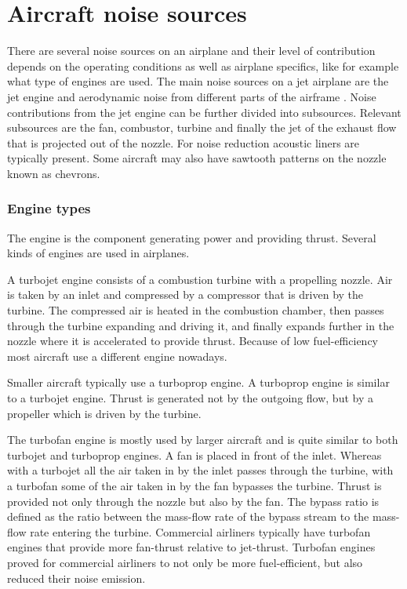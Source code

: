 \section{Aircraft noise sources}

%

There are several noise sources on an airplane and their level of contribution
depends on the operating conditions as well as airplane specifics, like for
example what type of engines are used. The main noise sources on a jet airplane
are the jet engine and aerodynamic noise from different parts of the airframe
\cite{Zaporozhets2011}. Noise contributions from the jet engine can be further
divided into subsources. Relevant subsources are the fan, combustor, turbine and
finally the jet of the exhaust flow that is projected out of the nozzle. For
noise reduction acoustic liners are typically present. Some aircraft may also
have sawtooth patterns on the nozzle known as chevrons.

\subsubsection{Engine types}
The engine is the component generating power and providing thrust. Several kinds
of engines are used in airplanes.

A turbojet engine consists of a combustion turbine with a propelling nozzle. Air
is taken by an inlet and compressed by a compressor that is driven by the
turbine. The compressed air is heated in the combustion chamber, then passes
through the turbine expanding and driving it, and finally expands further in the
nozzle where it is accelerated to provide thrust. Because of low fuel-efficiency
most aircraft use a different engine nowadays.

Smaller aircraft typically use a turboprop engine. A turboprop engine is similar
to a turbojet engine. Thrust is generated not by the outgoing flow, but by a
propeller which is driven by the turbine.

The turbofan engine is mostly used by larger aircraft and is quite similar to
both turbojet and turboprop engines. A fan is placed in front of the inlet.
Whereas with a turbojet all the air taken in by the inlet passes through the
turbine, with a turbofan some of the air taken in by the fan bypasses the
turbine. Thrust is provided not only through the nozzle but also by the fan. The
bypass ratio is defined as the ratio between the mass-flow rate of the bypass stream
to the mass-flow rate entering the turbine. Commercial airliners typically have
 turbofan engines that provide more fan-thrust relative to
jet-thrust. Turbofan engines proved for commercial airliners to not only be more
fuel-efficient, but also reduced their noise emission.

